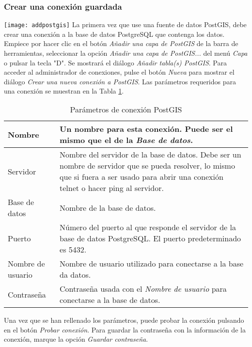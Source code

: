 \subsubsection{Crear una conexión guardada}\label{sec:postgis_stored}

\texttt{[image: addpostgis]} La primera vez que use una fuente de datos PostGIS, debe crear una conexión a la base de datos PostgreSQL que contenga los datos. Empiece por hacer clic en el botón \textit{Añadir una capa de PostGIS} de la barra de herramientas, seleccionar la opción \textit{Añadir una capa de PostGIS...} del menú \textit{Capa} o pulsar la tecla "D". Se mostrará el diálogo \textsl{Añadir tabla(s) PostGIS}. Para acceder al administrador de conexiones, pulse el botón \textsl{Nueva} para mostrar el diálogo \textsl{Crear una nueva conexión a PostGIS}. Las parámetros requeridos para una conexión se muestran en la Tabla \ref{tab:postgis_connection_parms}.

\begin{table}[h]
\centering
\caption{Parámetros de conexión PostGIS}\label{tab:postgis_connection_parms}\medskip
 \begin{tabular}{|l|p{5in}|}
\hline Nombre & Un nombre para esta conexión. Puede ser el mismo que el de la \textsl{Base de datos}.
\\
\hline Servidor \index{PostgreSQL!host}
& Nombre del servidor de la base de datos. Debe ser un nombre de servidor que se pueda resolver, lo mismo que si fuera a ser usado para abrir una conexión telnet o hacer ping al servidor. \\
\hline Base de datos \index{PostgreSQL!database} & Nombre de la base de datos.  \\
\hline Puerto \index{PostgreSQL!port}& Número del puerto al que responde el servidor de la base de datos PostgreSQL. El puerto predeterminado es 5432.\\
\hline Nombre de usuario \index{PostgreSQL!username}& Nombre de usuario utilizado para conectarse a la base da datos. \\
\hline Contraseña \index{PostgreSQL!password}& Contraseña usada con el \textsl{Nombre de usuario} para conectarse a la base de datos.\\
\hline
\end{tabular}
\end{table}

Una vez que se han rellenado los parámetros, puede probar la conexión pulsando en el botón \textsl{Probar conexión}. Para guardar la contraseña con la información de la conexión, marque la opción \textsl{Guardar contraseña}.

